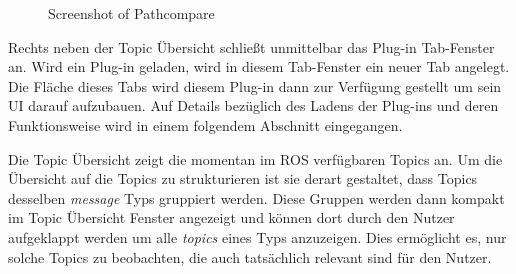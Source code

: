\begin{figure}[t]
  \begin{center}
  \end{center}
  \caption{Screenshot of Pathcompare}
  \label{fig:pathcompare}
\end{figure}

Rechts neben der Topic Übersicht schließt unmittelbar das Plug-in
Tab-Fenster an.
Wird ein Plug-in geladen, wird in diesem Tab-Fenster ein neuer Tab angelegt. Die
Fläche dieses Tabs wird diesem Plug-in dann zur Verfügung gestellt um sein UI
darauf aufzubauen. Auf Details bezüglich des Ladens der Plug-ins und deren
Funktionsweise wird in einem folgendem Abschnitt eingegangen. 

Die Topic Übersicht zeigt die momentan im \gls{ROS} verfügbaren Topics an. 
Um die Übersicht auf die Topics zu strukturieren ist sie derart
gestaltet, dass Topics desselben \textit{message} Typs gruppiert werden. Diese
Gruppen werden dann kompakt im Topic Übersicht Fenster angezeigt und können dort durch
den Nutzer aufgeklappt werden um alle \textit{topics} eines Typs anzuzeigen.
Dies ermöglicht es, nur solche Topics zu beobachten, die auch
tatsächlich relevant sind für den Nutzer. 

